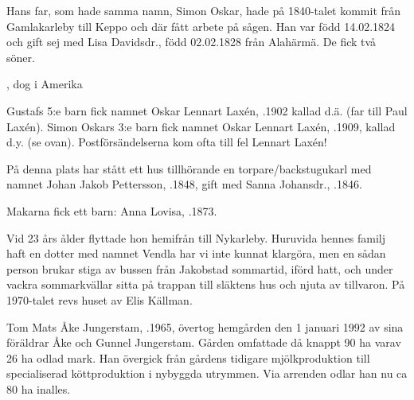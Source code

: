 Hans far, som hade samma namn, Simon Oskar, hade på 1840-talet kommit från Gamlakarleby till Keppo och där fått arbete på sågen. Han var född 14.02.1824 och gift sej med Lisa Davidsdr., född 02.02.1828 från Alahärmä. De fick två söner.
\begin{jhchildren}
  \item {}, dog i Amerika
  \item {}
\end{jhchildren}

Gustafs  5:e barn fick namnet Oskar Lennart Laxén, .1902 kallad  d.ä. (far till Paul Laxén). Simon Oskars 3:e barn fick namnet Oskar Lennart Laxén, .1909, kallad d.y. (se ovan). Postförsändelserna kom ofta till fel Lennart Laxén!



%


%
På denna plats har stått ett hus tillhörande en torpare/backstugukarl med namnet Johan Jakob Pettersson, .1848, gift med Sanna Johansdr., .1846.

Makarna fick ett barn: Anna Lovisa, .1873.

Vid 23 års ålder flyttade hon hemifrån till Nykarleby. Huruvida hennes familj haft en dotter med namnet Vendla har vi inte kunnat klargöra, men en sådan person brukar stiga av bussen från Jakobstad sommartid, iförd hatt, och under vackra sommarkvällar sitta på trappan till släktens hus och njuta av tillvaron. På 1970-talet revs huset av Elis Källman.



%



%
Tom Mats Åke Jungerstam, .1965, övertog hemgården den 1 januari 1992 av sina föräldrar Åke och Gunnel Jungerstam. Gården omfattade då knappt 90 ha varav 26 ha odlad mark. Han övergick från gårdens tidigare mjölkproduktion till specialiserad köttproduktion i nybyggda utrymmen. Via arrenden odlar han nu ca 80 ha inalles.

